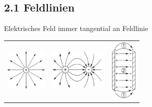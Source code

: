 \subsection{2.1 Feldlinien}
    Elektrisches Feld immer tangential an Feldlinie
    \begin{tabular}{c c c}
        \includegraphics[height = 20mm]{src/images/punktladung.png} & \includegraphics[height = 20mm]{src/images/zwei_punktladung.png} & \includegraphics[height = 30mm]{src/images/kondensator.png}
    \end{tabular}